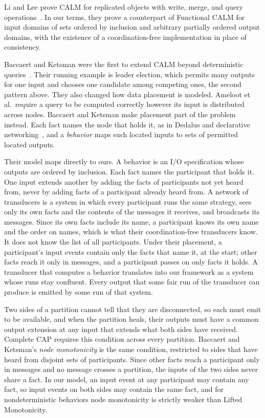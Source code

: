\documentclass[sigconf]{cidr-2027}
\theoremstyle{remark}
\newcommand{\outnoun}{output extension\xspace}%
\newcommand{\spectype}[1][]{I/O specification#1\xspace}
\begin{document}
\textcolor{reviewed}{Li and Lee prove CALM for replicated objects with write, merge, and query
operations~\cite{li2025coordinationfree}.} In our terms, they prove a
counterpart of Functional CALM for input domains of sets ordered by inclusion
and arbitrary partially ordered output domains, with the existence of a
coordination-free implementation in place of consistency.

Baccaert and Ketsman were the first to extend CALM beyond deterministic
queries~\cite{baccaert2023dcbq,baccaert2026spectrum}. Their running example
is leader election, which permits many outputs for one input and chooses one
candidate among competing ones, the second pattern above. They also
changed how data placement is modeled. Ameloot et al.\ require a query to be
computed correctly however its input is distributed across nodes. Baccaert
and Ketsman make placement part of the problem instead. Each fact names the
node that holds it, as in Dedalus and declarative
networking~\cite{alvaro2010dedalus,loo2009declarative}, and a
\emph{behavior} maps such located inputs to sets of permitted located outputs.

Their model maps directly to ours. A behavior is an \spectype whose outputs
are ordered by inclusion. Each fact names the participant that holds it. One
input extends another by adding the facts of participants not yet heard from,
never by adding facts of a participant already heard from. A network of
transducers is a system in which every participant runs the same strategy,
sees only its own facts and the contents of the messages it receives, and
broadcasts its messages. Since its own facts include its name, a participant
knows its own name and the order on names, which is what their coordination-free
transducers know. It does not know the list of all participants. Under their
placement, a participant's input events contain only the facts that name it, at
the start; other facts reach it only in messages, and a participant passes on
only facts it holds. A
transducer that computes a behavior translates into our framework as a system
whose runs stay confluent. Every output that some fair run of the transducer can produce is
emitted by some run of that system.

Two sides of a partition cannot tell that they are disconnected, so each must
emit to be available, and when the partition heals, their outputs must have a
common \outnoun at any input that extends what both sides have received. Complete CAP requires this condition across every partition. Baccaert and
Ketsman's \emph{node monotonicity} is the same condition, restricted to sides
that have heard from disjoint sets of participants. Since other facts reach a
participant only in messages and no message crosses a partition, the inputs of
the two sides never share a fact. In our model, an input event at any
participant may contain any fact, so input events on both sides may contain
the same fact, and for nondeterministic behaviors node monotonicity is strictly
weaker than Lifted Monotonicity.
\end{document}
